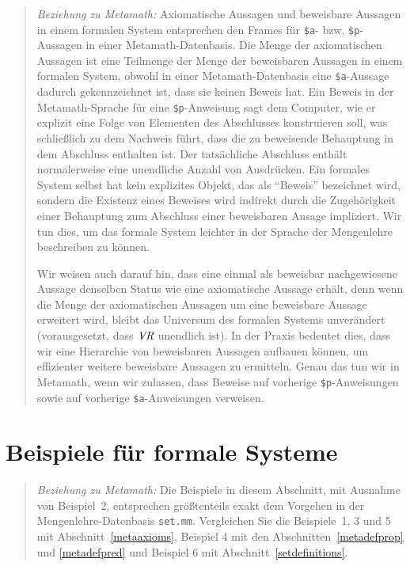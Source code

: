 {\footnotesize\begin{quotation}
{\em Beziehung zu Metamath:} Axiomatische Aussagen und beweisbare Aussagen in einem formalen System entsprechen den Frames für \texttt{\$a}- bzw. \texttt{\$p}-Aussagen in einer Metamath-Datenbasis.  Die Menge der axiomatischen Aussagen ist eine Teilmenge der Menge der beweisbaren Aussagen in einem formalen System, obwohl in einer Metamath-Datenbasis eine \texttt{\$a}-Aussage dadurch gekennzeichnet ist, dass sie keinen Beweis hat.  Ein Beweis in der Metamath-Sprache für eine \texttt{\$p}-Anweisung sagt dem Computer, wie er explizit eine Folge von Elementen des Abschlusses konstruieren soll, was schließlich zu dem Nachweis führt, dass die zu beweisende Behauptung in dem Abschluss enthalten ist.  Der tatsächliche Abschluss enthält normalerweise eine unendliche Anzahl von Ausdrücken.  Ein formales System selbst hat kein explizites Objekt, das als "`Beweis"' bezeichnet wird, sondern die Existenz eines Beweises wird indirekt durch die Zugehörigkeit einer Behauptung zum Abschluss einer beweisbaren Ausage impliziert.  Wir tun dies, um das formale System leichter in der Sprache der Mengenlehre beschreiben zu können.

Wir weisen auch darauf hin, dass eine einmal als beweisbar nachgewiesene Aussage denselben Status wie eine axiomatische Aussage erhält, denn wenn die Menge der axiomatischen Aussagen um eine beweisbare Aussage erweitert wird, bleibt das Universum des formalen Systems unverändert (vorausgesetzt, dass $\mbox{\em VR}$ unendlich ist). In der Praxis bedeutet dies, dass wir eine Hierarchie von beweisbaren Aussagen aufbauen können, um effizienter weitere beweisbare Aussagen zu ermitteln.  Genau das tun wir in Metamath, wenn wir zulassen, dass Beweise auf vorherige \texttt{\$p}-Anweisungen sowie auf vorherige \texttt{\$a}-Anweisungen verweisen.
\end{quotation}}


\section{Beispiele für formale Systeme}

{\footnotesize\begin{quotation}
{\em Beziehung zu Metamath:} Die Beispiele in diesem Abschnitt, mit Ausnahme von Beispiel~2, entsprechen größtenteils exakt dem Vorgehen in der Mengenlehre-Datenbasis \texttt{set.mm}.  Vergleichen Sie die Beispiele~1, 3 und 5 mit Abschnitt~\ref{metaaxioms}, Beispiel 4 mit den Abschnitten~\ref{metadefprop} und \ref{metadefpred} und Beispiel 6 mit Abschnitt~\ref{setdefinitions}.\label{exampleref}
\end{quotation}}

